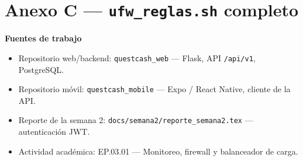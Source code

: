 \documentclass[11pt,letterpaper]{article}
\begin{document}


\newpage
\section*{Anexo C — \texttt{ufw\_reglas.sh} completo}



\vspace{1.2em}
\noindent\textbf{Fuentes de trabajo}

\begin{itemize}[leftmargin=1.4em,itemsep=2pt]
  \item Repositorio web/backend: \texttt{questcash\_web} — Flask, API \texttt{/api/v1}, PostgreSQL.
  \item Repositorio móvil: \texttt{questcash\_mobile} — Expo / React Native, cliente de la API.
  \item Reporte de la semana 2: \texttt{docs/semana2/reporte\_semana2.tex} — autenticación JWT.
  \item Actividad académica: EP.03.01 — Monitoreo, firewall y balanceador de carga.
\end{itemize}
\end{document}
